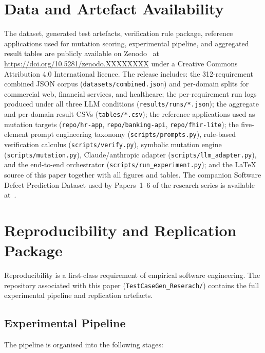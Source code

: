 \documentclass[conference]{IEEEtran}
\begin{document}
\section{Data and Artefact Availability}
\label{sec:availability}

The dataset, generated test artefacts, verification rule package, reference applications used for mutation scoring, experimental pipeline, and aggregated result tables are publicly available on Zenodo~\cite{javvadi2026raitg_dataset} at \url{https://doi.org/10.5281/zenodo.XXXXXXXX} under a Creative Commons Attribution 4.0 International licence. The release includes: the 312-requirement combined JSON corpus (\texttt{datasets/combined.json}) and per-domain splits for commercial web, financial services, and healthcare; the per-requirement run logs produced under all three LLM conditions (\texttt{results/runs/*.json}); the aggregate and per-domain result CSVs (\texttt{tables/*.csv}); the reference applications used as mutation targets (\texttt{repo/hr-app}, \texttt{repo/banking-api}, \texttt{repo/fhir-lite}); the five-element prompt engineering taxonomy (\texttt{scripts/prompts.py}), rule-based verification calculus (\texttt{scripts/verify.py}), symbolic mutation engine (\texttt{scripts/mutation.py}), Claude/anthropic adapter (\texttt{scripts/llm\_adapter.py}), and the end-to-end orchestrator (\texttt{scripts/run\_experiment.py}); and the LaTeX source of this paper together with all figures and tables. The companion Software Defect Prediction Dataset used by Papers~1--6 of the research series is available at~\cite{javvadi2025defect_dataset}.

\section{Reproducibility and Replication Package}
\label{sec:reproducibility}

Reproducibility is a first-class requirement of empirical software engineering. The repository associated with this paper (\texttt{TestCaseGen\_Reserach/}) contains the full experimental pipeline and replication artefacts.

\subsection{Experimental Pipeline}

The pipeline is organised into the following stages:
\end{document}
